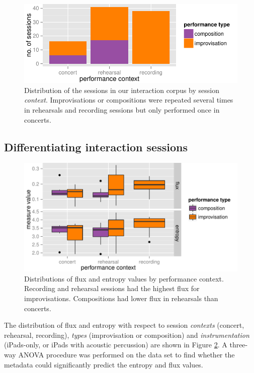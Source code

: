 \documentclass{sigchi}
\begin{document}
\begin{figure}
  \centering
  \includegraphics[width=\linewidth]{figures/sessions-count}
  \caption{Distribution of the sessions in our interaction corpus by
    session {\em context}. Improvisations or compositions were repeated
    several times in rehearsals and recording sessions but only performed
    once in concerts.
    \label{fig:count-data}}
\end{figure}


\subsection{Differentiating interaction sessions}
\label{differentiating-interaction-sessions}

\begin{figure} \centering
  \includegraphics[width=\linewidth]{figures/context-flux-entropy-boxplot}
  \caption{Distributions of flux and entropy values by performance
context. Recording and rehearsal sessions had the highest flux for
improvisations. Compositions had lower
flux in rehearsals than concerts.
\label{fig:flux-entropy-boxplot}}
\end{figure}

The distribution of flux and entropy with respect to session {\em contexts} (concert,
rehearsal, recording),
{\em types} (improvisation or composition) and {\em instrumentation} (iPads-only, or iPads with acoustic
percussion) are shown in Figure
\ref{fig:flux-entropy-boxplot}. A three-way ANOVA procedure was
performed on the data set to find whether the metadata could
significantly predict the entropy and flux values.
\end{document}
